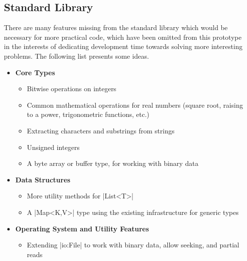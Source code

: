 \documentclass[11pt]{report}
\begin{document}
\subsection{Standard Library}

There are many features missing from the standard library which would be necessary for more practical code, which have been omitted from this prototype in the interests of dedicating development time towards solving more interesting problems. The following list presents some ideas.

\begin{itemize}
    \item \textbf{Core Types}
    
    \begin{itemize}[nosep,topsep=0pt]
        \item Bitwise operations on integers
        
        \item Common mathematical operations for real numbers (square root, raising to a power, trigonometric functions, etc.)
        
        \item Extracting characters and substrings from strings
        
        \item Unsigned integers
        
        \item A byte array or buffer type, for working with binary data
    \end{itemize}

    \item \textbf{Data Structures}
    
    \begin{itemize}[nosep,topsep=0pt]
        \item More utility methods for |List<T>|
        
        \item A |Map<K,V>| type using the existing infrastructure for generic types
    \end{itemize}
    
    \item \textbf{Operating System and Utility Features}
    
    \begin{itemize}[nosep,topsep=0pt]
        \item Extending |io:File| to work with binary data, allow seeking, and partial reads
        

\end{itemize}
\end{itemize}
\end{document}
